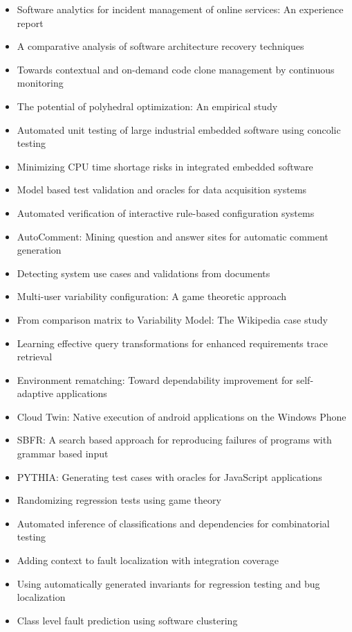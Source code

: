 {\begin{itemize}[itemsep=-1ex]
  \item Software analytics for incident management of online services: An experience report
  \item A comparative analysis of software architecture recovery techniques
  \item Towards contextual and on-demand code clone management by continuous monitoring
  \item The potential of polyhedral optimization: An empirical study
  \item Automated unit testing of large industrial embedded software using concolic testing
  \item Minimizing CPU time shortage risks in integrated embedded software
  \item Model based test validation and oracles for data acquisition systems
  \item Automated verification of interactive rule-based configuration systems
  \item AutoComment: Mining question and answer sites for automatic comment generation
  \item Detecting system use cases and validations from documents
  \item Multi-user variability configuration: A game theoretic approach
  \item From comparison matrix to Variability Model: The Wikipedia case study
  \item Learning effective query transformations for enhanced requirements trace retrieval
  \item Environment rematching: Toward dependability improvement for self-adaptive applications
  \item Cloud Twin: Native execution of android applications on the Windows Phone
  \item SBFR: A search based approach for reproducing failures of programs with grammar based input
  \item PYTHIA: Generating test cases with oracles for JavaScript applications
  \item Randomizing regression tests using game theory
  \item Automated inference of classifications and dependencies for combinatorial testing
  \item Adding context to fault localization with integration coverage
  \item Using automatically generated invariants for regression testing and bug localization
  \item Class level fault prediction using software clustering

\end{itemize}}
